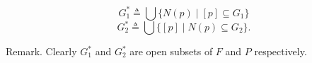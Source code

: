 $$G_1^* \triangleq \bigcup \{N(p) \mid [p] \subseteq G_1\}$$
$$G_2^* \triangleq \bigcup \{[p] \mid N(p) \subseteq G_2\}.$$

Remark. Clearly $G_1^*$ and $G_2^*$ are open subsets of $F$ and $P$ respectively.
